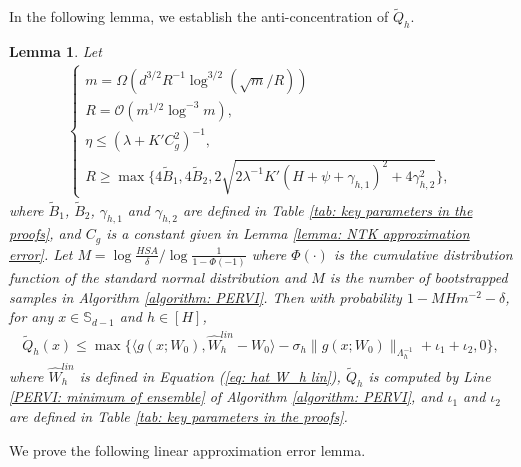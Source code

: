\documentclass{article} \usepackage{iclr2023/iclr2023_conference,times}
\newtheorem{lemma}{Lemma}[section]
\begin{document}
In the following lemma, we establish the anti-concentration of $\tilde{Q}_h$. 
\begin{lemma}
Let 
\begin{align}
\begin{cases}
m = \Omega \left( d^{3/2}  R^{-1} \log^{3/2} (\sqrt{m} / R) \right) \\
      R = \mathcal{O} \left( m^{1/2} \log^{-3} m \right), \\ 
\eta \leq (\lambda + K' C_g^2)^{-1}, \\
R \geq \max\{ 4 \tilde{B}_1, 4 \tilde{B}_2, 2 \sqrt{2\lambda^{-1}K' (H + \psi + \gamma_{h,1})^2 + 4 \gamma_{h,2}^2} \},
\end{cases}
\label{equation: conditions for R and eta final version repeated}
\end{align}
where $\tilde{B}_1$, $\tilde{B}_2$, $\gamma_{h,1}$ and $\gamma_{h,2}$ are defined in Table \ref{tab: key parameters in the proofs}, and $C_g$ is a constant given in Lemma \ref{lemma: NTK approximation error}. Let $M = \log \frac{HSA}{\delta}/ \log \frac{1}{1 - \Phi(-1)}$ where $\Phi(\cdot)$ is the cumulative distribution function of the standard normal distribution and $M$ is the number of bootstrapped samples in Algorithm \ref{algorithm: PERVI}. Then with probability $1 - MH m^{-2} - \delta$, for any $x \in \mathbb{S}_{d-1}$ and $h \in [H]$, \begin{align*}
\tilde{Q}_h(x) \leq \max\{\langle g(x; W_0), \hat{W}_h^{lin} - W_0 \rangle  -\sigma_h \| g(x; W_0) \|_{\Lambda_h^{-1}} + \iota_1 + \iota_2, 0\},
\end{align*}
where $\hat{W}^{lin}_h$ is defined in Equation (\ref{eq: hat W_h lin}), $\tilde{Q}_h$ is computed by Line \ref{PERVI: minimum of ensemble} of Algorithm \ref{algorithm: PERVI}, and $\iota_1$ and $\iota_2$ are defined in Table \ref{tab: key parameters in the proofs}. 
\label{Lemma: anti-concentration of tilde Q}
\end{lemma}


We prove the following linear approximation error lemma. 
\end{document}
